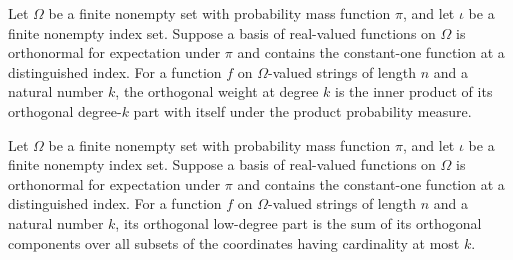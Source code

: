 \begin{definition}
\label{FABL.FiniteFourierBasis.orthogonalWeightAtDegree}
\leanok
{}
Let $\Omega$ be a finite nonempty set with probability mass function $\pi$, and let
$\iota$ be a finite nonempty index set. Suppose a basis of real-valued functions on
$\Omega$ is orthonormal for expectation under $\pi$ and contains the constant-one
function at a distinguished index. For a function $f$ on $\Omega$-valued strings of
length $n$ and a natural number $k$, the orthogonal weight at degree $k$ is the inner
product of its orthogonal degree-$k$ part with itself under the product probability measure.
\end{definition}

\begin{definition}
\label{FABL.FiniteFourierBasis.orthogonalLowDegreePart}
\leanok
{}
Let $\Omega$ be a finite nonempty set with probability mass function $\pi$, and let
$\iota$ be a finite nonempty index set. Suppose a basis of real-valued functions on
$\Omega$ is orthonormal for expectation under $\pi$ and contains the constant-one
function at a distinguished index. For a function $f$ on $\Omega$-valued strings of
length $n$ and a natural number $k$, its orthogonal low-degree part is the sum of its
orthogonal components over all subsets of the coordinates having cardinality at most $k$.
\end{definition}

